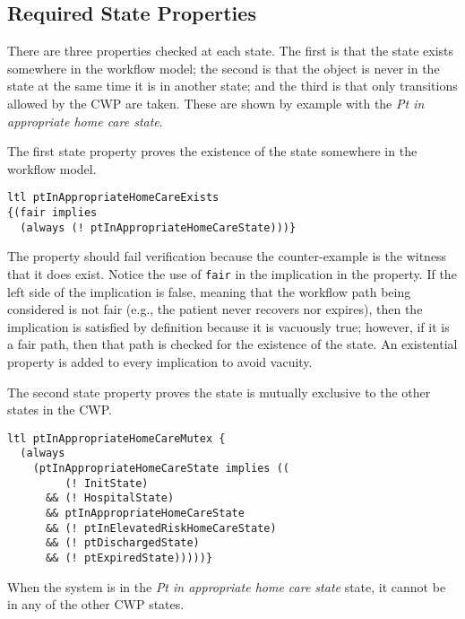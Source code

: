 \begin{comment}
The term \emph{fair} is a reference to the over-approximating nature of the workflow model. Indeed, in considering the workflow in \figref{fig:bpmn}, it is possible that a patient is never discharged or that the patient never expires. Such a behavior is \emph{not fair} because it is not emblematic of the real world---patients eventually are discharged or expire. As such, the property proves the existence of paths in the workflow that end in the goal states, and this same property is used later to restrict verification to only those paths that end in one of goal states thereby excluding from consideration, in verification, any infinite workflow behaviors where the patient never recovers or expires.
\end{comment}

\subsection{Required State Properties}
There are three properties checked at each state. The first is that the state exists somewhere in the workflow model; the second is that the object is never in the state at the same time it is in another state; and the third is that only transitions allowed by the CWP are taken. These are shown by example with the \emph{Pt in appropriate home care state}.

The first state property proves the existence of the state somewhere in the workflow model.
%
{\small
\begin{lstlisting}[style=myPromela]
ltl ptInAppropriateHomeCareExists 
{(fair implies 
  (always (! ptInAppropriateHomeCareState)))}
\end{lstlisting}
}
%
\noindent The property should fail verification because the counter-example is the witness that it does exist. Notice the use of \texttt{fair} in the implication in the property. If the left side of the implication is false, meaning that the workflow path being considered is not fair (e.g., the patient never recovers nor expires), then the implication is satisfied by definition because it is vacuously true; however, if it is a fair path, then that path is checked for the existence of the state. An existential property is added to every implication to avoid vacuity.

The second state property proves the state is mutually exclusive to the other states in the CWP.
%
{\small
\begin{lstlisting}[style=myPromela]
ltl ptInAppropriateHomeCareMutex {
  (always 
    (ptInAppropriateHomeCareState implies ((
         (! InitState) 
      && (! HospitalState) 
      && ptInAppropriateHomeCareState 
      && (! ptInElevatedRiskHomeCareState) 
      && (! ptDischargedState) 
      && (! ptExpiredState)))))}
\end{lstlisting}
}
%
\noindent When the system is in the \emph{Pt in appropriate home care state} state, it cannot be in any of the other CWP states. 

